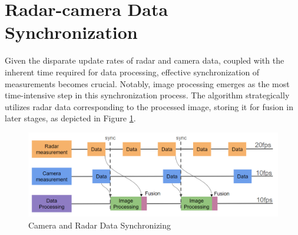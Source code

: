 \section{Radar-camera Data Synchronization}\label{sec:2-sync}
Given the disparate update rates of radar and camera data, 
coupled with the inherent time required for data processing, 
effective synchronization of measurements becomes crucial. 
Notably, image processing emerges as the most time-intensive step in this synchronization process. 
The algorithm strategically utilizes radar data corresponding to the processed image, storing it for fusion in later stages, 
as depicted in Figure \ref{fig:sync_radar_cam}.
\begin{figure}[hpbt]
    \centering
    \includegraphics[width=\textwidth]{Figures/syncing.png}%
    \caption{Camera and Radar Data Synchronizing}
    \label{fig:sync_radar_cam}
\end{figure}





